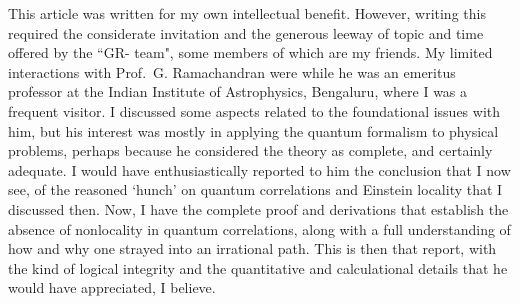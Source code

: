 This article was written for my own intellectual benefit. However, writing this required
the considerate invitation and the generous leeway of topic and time offered by the ``GR-
team", some members of which are my friends. My limited interactions with Prof.\ G.
Ramachandran were while he was an emeritus professor at the Indian Institute of Astrophysics, Bengaluru, where I was a frequent visitor. I discussed some aspects related to the
foundational issues with him, but his interest was mostly in applying the quantum formalism to physical problems, perhaps because he considered the theory as complete, and certainly adequate. I would have enthusiastically reported to him the conclusion that I now see, of the reasoned
`hunch' on quantum correlations and Einstein locality that I discussed then. Now, I have
the complete proof and derivations that establish the absence of nonlocality in quantum
correlations, along with a full understanding of how and why one strayed into an irrational
path. This is then that report, with the kind of logical integrity and the quantitative and
calculational details that he would have appreciated, I believe.

